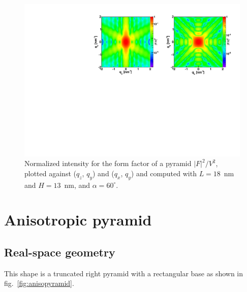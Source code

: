 \begin{figure}[h]
\begin{center}
\includegraphics[width=\textwidth]{Figures/figffpyramid}
\end{center}
\caption{Normalized intensity for the form factor of a
  pyramid $|F|^2/V^2$, plotted against ($q_z$, $q_y$) and  
  ($q_x$, $q_y$) and computed with $L=18$~nm and $H=13$~nm, and $\alpha=60^{\circ}$.}
\label{fig:FFPyramidEx}
\end{figure}

\FloatBarrier



\newpage{\cleardoublepage}
\section{Anisotropic pyramid}  

\subsection{Real-space geometry}
This shape is a truncated right pyramid with a rectangular base as
shown in fig.~\ref{fig:anisopyramid}.

